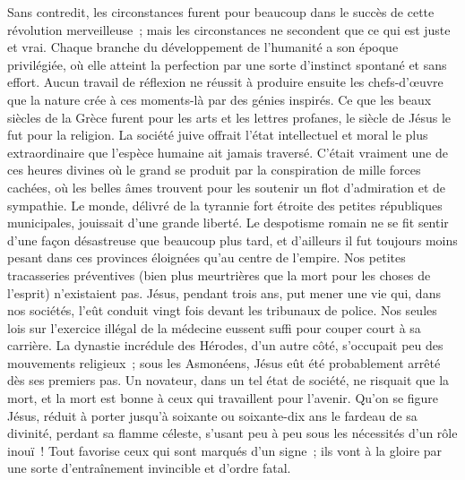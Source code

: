 \documentclass[french,twoside]{book} %
\begin{document}
Sans contredit, les circonstances furent pour beaucoup dans le succès de cette révolution merveilleuse ; mais les circonstances ne secondent que ce qui est juste et vrai. Chaque branche du développement de l’humanité a son époque privilégiée, où elle atteint la perfection par une sorte d’instinct spontané et sans effort. Aucun travail de réflexion ne réussit à produire ensuite les chefs-d’œuvre que la nature crée à ces moments-là par des génies inspirés. Ce que les beaux siècles de la Grèce furent pour les arts et les lettres profanes, le siècle de Jésus le fut pour la religion. La société juive offrait l’état intellectuel et moral le plus extraordinaire que l’espèce humaine ait jamais traversé. C’était vraiment une de ces heures divines où le grand se produit par la conspiration de mille forces cachées, où les belles âmes trouvent pour les soutenir un flot d’admiration et de sympathie. Le monde, délivré de la tyrannie fort étroite des petites républiques municipales, jouissait d’une grande liberté. Le despotisme romain ne se fit sentir d’une façon désastreuse que beaucoup plus tard, et d’ailleurs il fut toujours moins pesant dans ces provinces éloignées qu’au centre de l’empire. Nos petites tracasseries préventives (bien plus meurtrières que la mort pour les choses de l’esprit) n’existaient pas. Jésus, pendant trois ans, put mener une vie qui, dans nos sociétés, l’eût conduit vingt fois devant les tribunaux de police. Nos seules lois sur l’exercice illégal de la médecine eussent suffi pour couper court à sa carrière. La dynastie incrédule des Hérodes, d’un autre côté, s’occupait peu des mouvements religieux ; sous les Asmonéens, Jésus eût été probablement arrêté dès ses premiers pas. Un novateur, dans un tel état de société, ne risquait que la mort, et la mort est bonne à ceux qui travaillent pour l’avenir. Qu’on se figure Jésus, réduit à porter jusqu’à soixante ou soixante-dix ans le fardeau de sa divinité, perdant sa flamme céleste, s’usant peu à peu sous les nécessités d’un rôle inouï ! Tout favorise ceux qui sont marqués d’un signe ; ils vont à la gloire par une sorte d’entraînement invincible et d’ordre fatal.\par
\end{document}
